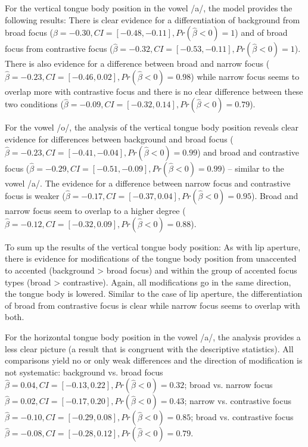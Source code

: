 For the vertical tongue body position in the vowel /a/, the model provides the following results: There is clear evidence for a differentiation of background from broad focus ($\hat\beta=-0.30 , CI=[-0.48, -0.11], \allowbreak Pr(\hat\beta<0)=1$) and of broad focus from contrastive focus ($\hat\beta=-0.32 , CI=[-0.53, -0.11], \allowbreak Pr(\hat\beta<0)=1$). There is also evidence for a difference between broad and narrow focus ($\hat\beta=-0.23 , CI=[-0.46, 0.02], \allowbreak Pr(\hat\beta<0)=0.98$) while narrow focus seems to overlap more with contrastive focus and there is no clear difference between these two conditions ($\hat\beta=-0.09 , CI=[-0.32, 0.14], \allowbreak Pr(\hat\beta<0)=0.79$).

For the vowel /o/, the analysis of the vertical tongue body position reveals clear evidence for differences between background and broad focus ($\hat\beta=-0.23, CI=[-0.41, -0.04], \allowbreak Pr(\hat\beta<0)=0.99$) and broad and contrastive focus ($\hat\beta=-0.29 , CI=[-0.51, -0.09], \allowbreak Pr(\hat\beta<0)=0.99$) -- similar to the vowel /a/. The evidence for a difference between narrow focus and contrastive focus is weaker ($\hat\beta=-0.17, CI=[-0.37, 0.04], \allowbreak Pr(\hat\beta<0)=0.95$). Broad and narrow focus seem to overlap to a higher degree ($\hat\beta=-0.12, CI=[-0.32, 0.09], \allowbreak Pr(\hat\beta<0)=0.88$).

To sum up the results of the vertical tongue body position: As with lip aperture, there is evidence for modifications of the tongue body position from unaccented to accented (background > broad focus) and within the group of accented focus types (broad > contrastive). Again, all modifications go in the same direction, the tongue body is lowered. Similar to the case of lip aperture, the differentiation of broad from contrastive focus is clear while narrow focus seems to overlap with both.

For the horizontal tongue body position in the vowel /a/, the analysis provides a less clear picture (a result that is congruent with the descriptive statistics). All comparisons yield no or only weak differences and the direction of modification is not systematic: background vs. broad focus $\hat\beta=0.04 , CI=[-0.13, 0.22], \allowbreak Pr(\hat\beta<0)=0.32$; broad vs. narrow focus $\hat\beta=0.02 , CI=[-0.17, 0.20], \allowbreak Pr(\hat\beta<0)=0.43$; narrow vs. contrastive focus $\hat\beta=-0.10 , CI=[-0.29, 0.08], \allowbreak Pr(\hat\beta<0)=0.85$; broad vs. contrastive focus $\hat\beta=-0.08 , CI=[-0.28, 0.12], \allowbreak Pr(\hat\beta<0)=0.79$.

